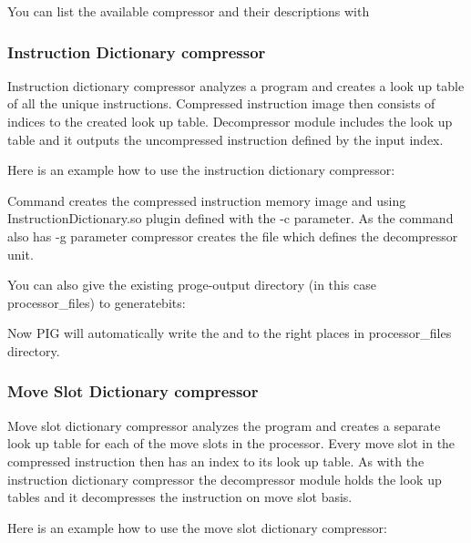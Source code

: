 \documentclass[a4paper,twoside]{tceusermanual}
\begin{document}
You can list the available compressor and their descriptions with


\subsubsection{Instruction Dictionary compressor}

Instruction dictionary compressor analyzes a program and creates a look up table
of all the unique instructions. Compressed instruction image then consists of
indices to the created look up table. Decompressor module includes the look up
table and it outputs the uncompressed instruction defined by the input index.

Here is an example how to use the instruction dictionary compressor:


Command creates the compressed instruction memory image  and
 using InstructionDictionary.so plugin defined with the
-c parameter. As the command also has -g parameter compressor creates the
 file which defines the decompressor unit.

You can also give the existing proge-output directory (in this case
processor\_files) to generatebits:


Now PIG will automatically write the  and
 to the right places in processor\_files directory.

\subsubsection{Move Slot Dictionary compressor}

Move slot dictionary compressor analyzes the program and creates a separate
look up table for each of the move slots in the processor. Every move slot in
the compressed instruction then has an index to its look up table. As with the
instruction dictionary compressor the decompressor module holds the look up
tables and it decompresses the instruction on move slot basis.

Here is an example how to use the move slot dictionary compressor:
\end{document}
